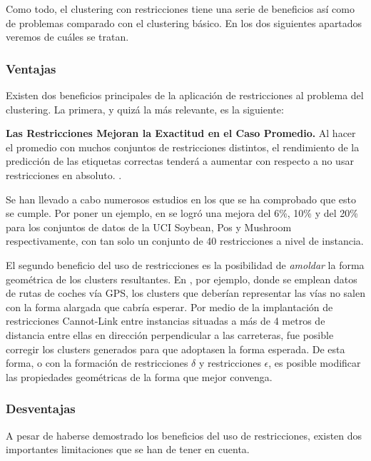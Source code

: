 Como todo, el clustering con restricciones tiene una serie de beneficios así como de problemas comparado con el clustering básico. En los dos siguientes apartados veremos de cuáles se tratan.

\subsubsection{Ventajas}

Existen dos beneficios principales de la aplicación de restricciones al problema del clustering. La primera, y quizá la más relevante, es la siguiente:

\begin{observacion} 
	\textbf{Las Restricciones Mejoran la Exactitud en el Caso Promedio.} Al hacer el promedio con muchos conjuntos de restricciones distintos, el rendimiento de la predicción de las etiquetas correctas tenderá a aumentar con respecto a no usar restricciones en absoluto. \cite{davidson2007survey}.
	\label{ob:improvement}
\end{observacion}


Se han llevado a cabo numerosos estudios en los que se ha comprobado que esto se cumple. Por poner un ejemplo, en \cite{wagstaff2000clustering} se logró una mejora del 6\%, 10\% y del 20\% para los conjuntos de datos de la UCI Soybean, Pos y Mushroom respectivamente, con tan solo un conjunto de 40 restricciones a nivel de instancia.

El segundo beneficio del uso de restricciones es la posibilidad de \emph{amoldar} la forma geométrica de los clusters resultantes. En \cite{wagstaff2001constrained}, por ejemplo, donde se emplean datos de rutas de coches vía GPS, los clusters que deberían representar las vías no salen con la forma alargada que cabría esperar. Por medio de la implantación de restricciones Cannot-Link entre instancias situadas a más de 4 metros de distancia entre ellas en dirección perpendicular a las carreteras, fue posible corregir los clusters generados para que adoptasen la forma esperada. De esta forma, o con la formación de restricciones $\delta$ y restricciones $\epsilon$, es posible modificar las propiedades geométricas de la forma que mejor convenga.

\subsubsection{Desventajas}

A pesar de haberse demostrado los beneficios del uso de restricciones, existen dos importantes limitaciones que se han de tener en cuenta.


